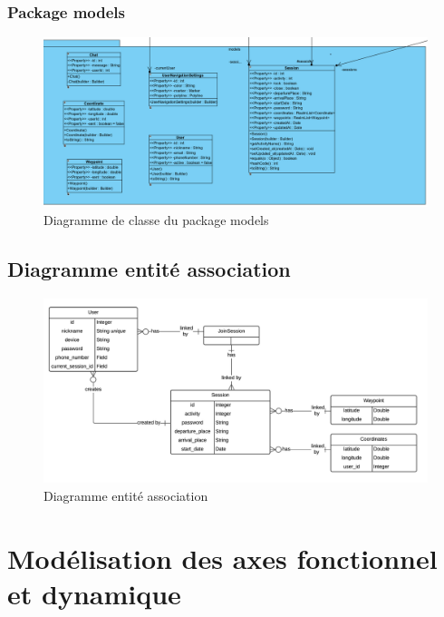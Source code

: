 \documentclass[titlepage, 12pt]{report}
\begin{document}
\clearpage

\subsubsection{Package models}

\begin{figure}[!h]
	\caption{Diagramme de classe du package models}
	\label{class_diagram_models}
	\centering
	\includegraphics[scale=0.3]{Images/diagram/package_models_diagram_class.png}
\end{figure}

\clearpage

\subsection{Diagramme entité association}

\begin{figure}[!h]
	\caption{Diagramme entité association}
	\label{database_ERD}
	\centering
	\includegraphics[scale=0.7]{Images/diagram/database_ERD.png}
\end{figure}

\section{Modélisation des axes fonctionnel et dynamique}
\end{document}
